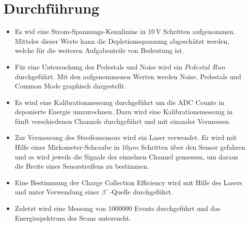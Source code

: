 \section{Durchführung}
\label{sec:Durchführung}
\begin{itemize}
\item
Es wid eine Strom-Spannungs-Kennlinine in 10$\,$V Schritten aufgenommen. Mitteles dieser
Werte kann die Depletionsspannung abgeschätzt werden, welche für die
weiteren Aufgabenteile von Bedeutung ist.

\item Für eine Untersuchung des Pedestals und Noise wird ein
$Pedestal\,\, Run$ durchgeführt. Mit den aufgenommenen Werten
werden Noise, Pedestals und Common Mode graphisch dargestellt.

\item Es wird eine Kalibrationmessung durchgeführt um die ADC Counts
in deponierte Energie umzurechnen. Dazu wird eine Kalibrationsmessung
in fünft verschiedenen Channels durchgeführt und mit einander Vermessen.
\item
Zur Vermessung des Streifensensors wird ein Laser verwendet. Er wird mit
Hilfe einer Mirkometer-Schraube in $10\mu m$ Schritten über den Sensor gefahren
und es wird jeweils die Signale der einzelnen Channel gemessen, um daraus
die Breite eines Senorstreifens zu bestimmen.

\item Eine Bestimmung der Charge Collection Efficiency wird mit Hilfe
des Lasers und unter Verwendung einer $\beta^-$-Quelle durchgeführt.

\item Zuletzt wird eine Messung von 1000000 Events durchgeführt und das Energiespektrum
des Scans untersucht.
\end{itemize}
